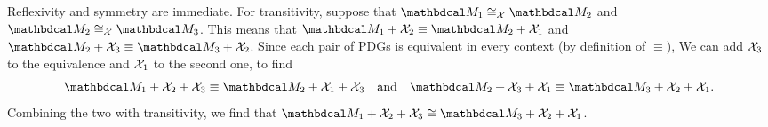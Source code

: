 \begin{subappendices}
    
    \begin{lproof} \label{proof:cong-modX-equiv}
        Reflexivity and symmetry are immediate. For transitivity, suppose that $\dg M_1 \cong_\X \dg M_2$ and $\dg M_2 \cong_\X \dg M_3$. 
        This means that
            $\dg M_1 + \X_2 \equiv \dg M_2 + \X_1$ and $\dg M_2 + \X_3 \equiv \dg M_3 + \X_2$. 
        Since each pair of PDGs is equivalent in every context (by definition of $\equiv$),
        We can add $\mathcal X_3$ to the equivalence and $\mathcal X_1$ to the second one, to find
        \[
            \dg M_1 + \X_2 + \X_3 \equiv \dg M_2 + \X_1 + \X_3
            \quad\text{and}\quad
            \dg M_2 + \X_3 + \X_1 \equiv \dg M_3 + \X_2 + \X_1. 
        \]
        Combining the two with transitivity, we find that 
        $\dg M_1 + \X_2 + \X_3 \cong \dg M_3 + \X_2 + \X_1$.
            

\end{lproof}
\end{subappendices}
